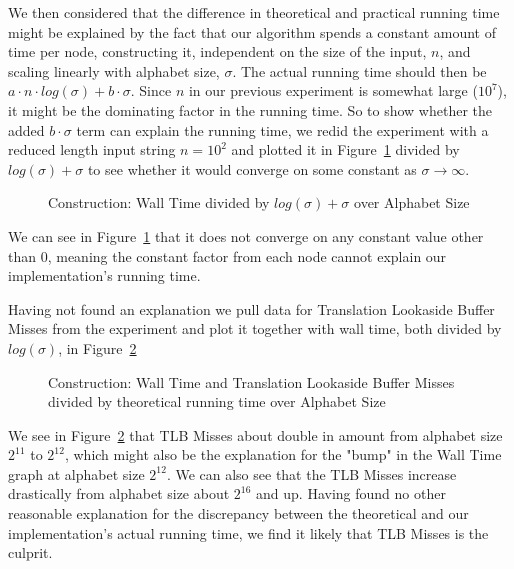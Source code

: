 We then considered that the difference in theoretical and practical running time might be explained by the fact that our algorithm spends a constant amount of time per node, constructing it, independent on the size of the input, $n$, and scaling linearly with alphabet size, $\sigma$.
The actual running time should then be $a \cdot n \cdot log(\sigma) + b \cdot \sigma$.
Since $n$ in our previous experiment is somewhat large ($10^7$), it might be the dominating factor in the running time.
So to show whether the added $b \cdot \sigma$ term can explain the running time, we redid the experiment with a reduced length input string $n = 10^2$ and plotted it in Figure~\ref{fig:naiveIntegerAlphabetSize_WallTime_plusSigma} divided by $log(\sigma) + \sigma$ to see whether it would converge on some constant as $\sigma \rightarrow \infty$.
\begin{figure}

\caption{Construction: Wall Time divided by $log(\sigma) + \sigma$ over Alphabet Size}
\label{fig:naiveIntegerAlphabetSize_WallTime_plusSigma}
\end{figure}
We can see in Figure~\ref{fig:naiveIntegerAlphabetSize_WallTime_plusSigma} that it does not converge on any constant value other than 0, meaning the constant factor from each node cannot explain our implementation's running time.

Having not found an explanation we pull data for Translation Lookaside Buffer Misses from the experiment and plot it together with wall time, both divided by $log(\sigma)$, in Figure~\ref{fig:naiveIntegerAlphabetSize_WallTime_TLB}

\begin{figure}
	
	\caption{Construction: Wall Time and Translation Lookaside Buffer Misses divided by theoretical running time  over Alphabet Size}
	\label{fig:naiveIntegerAlphabetSize_WallTime_TLB}
\end{figure}

We see in Figure~\ref{fig:naiveIntegerAlphabetSize_WallTime_TLB} that TLB Misses about double in amount from alphabet size $2^{11}$ to $2^{12}$, which might also be the explanation for the "bump" in the Wall Time graph at alphabet size $2^{12}$.
We can also see that the TLB Misses increase drastically from alphabet size about $2^{16}$ and up.
Having found no other reasonable explanation for the discrepancy between the theoretical and our implementation's actual running time, we find it likely that TLB Misses is the culprit.


